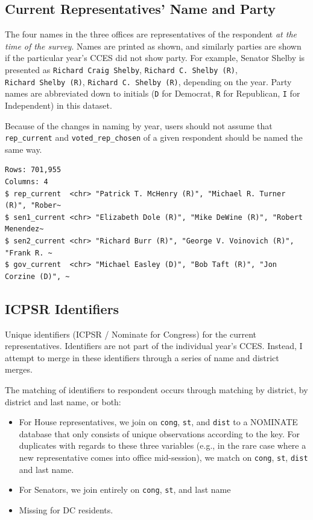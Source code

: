 \documentclass[10pt,article,oneside]{memoir}
\begin{document}
\subsection{Current Representatives' Name and
Party}\label{current-representatives-name-and-party}

The four names in the three offices are representatives of the
respondent \emph{at the time of the survey}. Names are printed as shown,
and similarly parties are shown if the particular year's CCES did not
show party. For example, Senator Shelby is presented as
\texttt{Richard\ Craig\ Shelby}, \texttt{Richard\ C.\ Shelby\ (R)},
\texttt{Richard\ Shelby\ (R)}, \texttt{Richard\ C.\ Shelby\ (R)},
depending on the year. Party names are abbreviated down to initials
(\texttt{D} for Democrat, \texttt{R} for Republican, \texttt{I} for
Independent) in this dataset.

Because of the changes in naming by year, users should not assume that
\texttt{rep\_current} and \texttt{voted\_rep\_chosen} of a given
respondent should be named the same way.

\begin{verbatim}
Rows: 701,955
Columns: 4
$ rep_current  <chr> "Patrick T. McHenry (R)", "Michael R. Turner (R)", "Rober~
$ sen1_current <chr> "Elizabeth Dole (R)", "Mike DeWine (R)", "Robert Menendez~
$ sen2_current <chr> "Richard Burr (R)", "George V. Voinovich (R)", "Frank R. ~
$ gov_current  <chr> "Michael Easley (D)", "Bob Taft (R)", "Jon Corzine (D)", ~
\end{verbatim}

\subsection{ICPSR Identifiers}\label{icpsr-identifiers}

Unique identifiers (ICPSR / Nominate for Congress) for the current
representatives. Identifiers are not part of the individual year's CCES.
Instead, I attempt to merge in these identifiers through a series of
name and district merges.

The matching of identifiers to respondent occurs through matching by
district, by district and last name, or both:

\begin{itemize}
\tightlist
\item
  For House representatives, we join on \texttt{cong}, \texttt{st}, and
  \texttt{dist} to a NOMINATE database that only consists of unique
  observations according to the key. For duplicates with regards to
  these three variables (e.g., in the rare case where a new
  representative comes into office mid-session), we match on
  \texttt{cong}, \texttt{st}, \texttt{dist} and last name.
\item
  For Senators, we join entirely on \texttt{cong}, \texttt{st}, and last
  name
\item
  Missing for DC residents.
\end{itemize}
\end{document}
